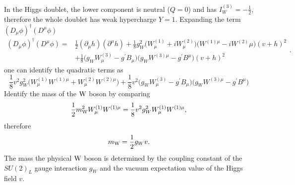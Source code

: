 In the Higgs doublet, the lower component is neutral ($Q=0$) and has $I_{W}^{(3)}=-\frac{1}{2}$, therefore the whole doublet has weak hypercharge $Y=1$. 
Expanding the term $(D_{\mu}\phi)^{\dagger}(D^{\mu}\phi)$
\begin{equation}
\label{eqn:DmuDmu}
\begin{split}
(D_{\mu}\phi)^{\dagger}(D^{\mu}\phi) = & \frac{1}{2}(\partial_{\mu}h)(\partial^{\mu}h)+\frac{1}{8}g_{W}^{2}\big(W_{\mu}^{(1)}+iW_{\mu}^{(2)}\big)\big(W^{(1)\mu}-iW^{(2)}\mu\big)(v+h)^{2} \\	
& + \frac{1}{8}\big(g_{W}W_{\mu}^{(3)}-g^{\prime}B_{\mu}\big)\big(g_{W}W^{(3)\mu}-g^{\prime}B^{\mu}\big)(v+h)^{2}
\end{split}
.
\end{equation}
one can identify the quadratic terms as 
\begin{equation}
\label{eqn:quadterm}
\frac{1}{8}v^{2}g_{W}^{2}\bigg(W_{\mu}^{(1)}W^{(1)\mu}+W_{\mu}^{(2)}W^{(2)\mu}\bigg)+\frac{1}{8}v^{2}\bigg(g_{W}W_{\mu}^{(3)}-g^{\prime}B_{\mu}\bigg)\bigg(g_{W}W^{(3)\mu}-g^{\prime}B^{\mu}\bigg)
\end{equation}
Identify the mass of the $\mathrm{W}$ boson by comparing
\begin{equation}
\frac{1}{2}m_{\mathrm{W}}^{2}W_{\mu}^{(1)}W^{(1)\mu}=\frac{1}{8}v^{2}g_{W}^{2}W_{\mu}^{(1)}W^{(1)\mu},
\end{equation}
therefore
\begin{equation}
\label{eqn:WbosonMass}
m_{\mathrm{W}}=\frac{1}{2}g_{W}v.
\end{equation}
The mass the physical $\mathrm{W}$ boson is determined by the coupling constant of the $SU(2)_{L}$ gauge interaction $g_{W}$ and the vacuum expectation value of the Higgs field $v$.

